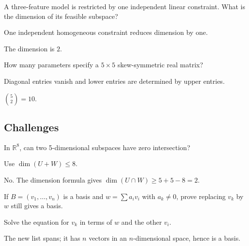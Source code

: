 \begin{exercise}\label{exr:i03-expand-13}
A three-feature model is restricted by one independent linear constraint. What is the dimension of its feasible subspace?
\end{exercise}
\begin{hint}
One independent homogeneous constraint reduces dimension by one.
\end{hint}
\begin{solution}
The dimension is \(2\).
\end{solution}

\begin{exercise}\label{exr:i03-expand-14}
How many parameters specify a \(5\times5\) skew-symmetric real matrix?
\end{exercise}
\begin{hint}
Diagonal entries vanish and lower entries are determined by upper entries.
\end{hint}
\begin{solution}
\(\binom52=10\).
\end{solution}

\subsection*{Challenges}

\begin{exercise}\label{exr:i03-expand-15}
In \(\mathbb R^8\), can two 5-dimensional subspaces have zero intersection?
\end{exercise}
\begin{hint}
Use \(\dim(U+W)\le8\).
\end{hint}
\begin{solution}
No. The dimension formula gives \(\dim(U\cap W)\ge5+5-8=2\).
\end{solution}

\begin{exercise}\label{exr:i03-expand-16}
If \(B=(v_1,\ldots,v_n)\) is a basis and \(w=\sum a_iv_i\) with \(a_k\neq0\), prove replacing \(v_k\) by \(w\) still gives a basis.
\end{exercise}
\begin{hint}
Solve the equation for \(v_k\) in terms of \(w\) and the other \(v_i\).
\end{hint}
\begin{solution}
The new list spans; it has \(n\) vectors in an \(n\)-dimensional space, hence is a basis.
\end{solution}
